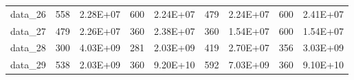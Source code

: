 \begin{table}[!h]
\begin{tabular}{lllllllll}
data\_26 & 558               & 2.28E+07             & 600                                      & 2.24E+07                                     & 479                                         & 2.24E+07                                        & 600                                      & 2.41E+07                                     \\
data\_27 & 479               & 2.26E+07             & 360                                      & 2.38E+07                                     & 360                                         & 1.54E+07                                        & 600                                      & 1.54E+07                                     \\
data\_28 & 300               & 4.03E+09             & 281                                      & 2.03E+09                                     & 419                                         & 2.70E+07                                        & 356                                      & 3.03E+09                                     \\
data\_29 & 538               & 2.03E+09             & 360                                      & 9.20E+10                                     & 592                                         & 7.03E+09                                        & 360                                      & 9.10E+10                                     \\ \hline
\end{tabular}
\end{table}